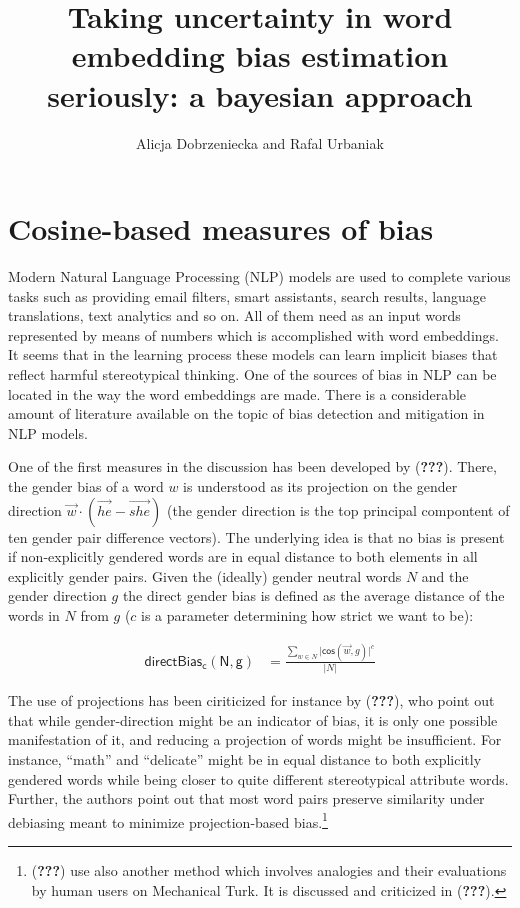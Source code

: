 \documentclass[10pt,dvipsnames,enabledeprecatedfontcommands]{scrartcl}
\title{Taking uncertainty in word embedding bias estimation seriously: a
bayesian approach}
\author{Alicja Dobrzeniecka and Rafal Urbaniak}
\date{}
\begin{document}
\maketitle

\tableofcontents

\section{Cosine-based measures of
bias}\label{cosine-based-measures-of-bias}

Modern Natural Language Processing (NLP) models are used to complete
various tasks such as providing email filters, smart assistants, search
results, language translations, text analytics and so on. All of them
need as an input words represented by means of numbers which is
accomplished with word embeddings. It seems that in the learning process
these models can learn implicit biases that reflect harmful
stereotypical thinking. One of the sources of bias in NLP can be located
in the way the word embeddings are made. There is a considerable amount
of literature available on the topic of bias detection and mitigation in
NLP models.

One of the first measures in the discussion has been developed by
({\textbf{???}}). There, the gender bias of a word \(w\) is understood
as its projection on the gender direction
\(\vec{w} \cdot (\overrightarrow{he} - \overrightarrow{she})\) (the
gender direction is the top principal compontent of ten gender pair
difference vectors). The underlying idea is that no bias is present if
non-explicitly gendered words are in equal distance to both elements in
all explicitly gender pairs. Given the (ideally) gender neutral words
\(N\) and the gender direction \(g\) the direct gender bias is defined
as the average distance of the words in \(N\) from \(g\) (\(c\) is a
parameter determining how strict we want to be):

\begin{align}
\mathsf{directBias_c(N,g)} & = \frac{\sum_{w\in N}\vert \mathsf{cos}(\vec{w},g)\vert^c}{\vert N \vert }
\end{align}

The use of projections has been ciriticized for instance by
({\textbf{???}}), who point out that while gender-direction might be an
indicator of bias, it is only one possible manifestation of it, and
reducing a projection of words might be insufficient. For instance,
``math'' and ``delicate'' might be in equal distance to both explicitly
gendered words while being closer to quite different stereotypical
attribute words. Further, the authors point out that most word pairs
preserve similarity under debiasing meant to minimize projection-based
bias.\footnote{({\textbf{???}}) use also another method which involves
  analogies and their evaluations by human users on Mechanical Turk. It
  is discussed and criticized in ({\textbf{???}}).}
\end{document}
